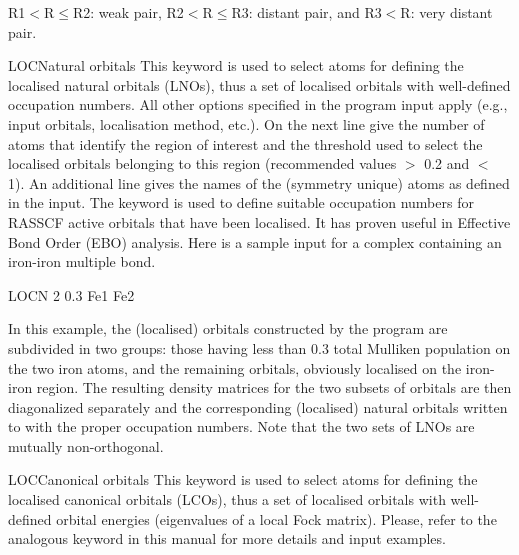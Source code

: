 \begin{keywordlist}
R1$<$R$\leq$R2: weak pair,
R2$<$R$\leq$R3: distant pair, and
R3$<$R: very distant pair.
\item[LOCNatural orbitals]
This keyword is used to select atoms for defining the localised natural
orbitals (LNOs), thus a set of localised orbitals with well-defined occupation numbers.
All other options specified in the  program input apply (e.g., input orbitals,
localisation method, etc.).
On the next line give the number of atoms that identify the region of interest
and the threshold used to select the localised orbitals belonging to this region
(recommended values $>$ 0.2 and $<$ 1).
An additional line gives the names of the (symmetry unique) atoms as defined in the  input.
The keyword  is used to define suitable occupation numbers for RASSCF active orbitals
that have been localised. It has proven useful in Effective Bond Order (EBO) analysis.
Here is a sample input for a complex containing an iron-iron multiple bond.
\begin{inputlisting}
 LOCN
 2  0.3
 Fe1  Fe2
\end{inputlisting}
In this example, the (localised) orbitals constructed by the  program
are subdivided in two groups: those having less than 0.3 total Mulliken population on
the two iron atoms, and the remaining orbitals, obviously localised on the iron-iron region. The resulting
density matrices for the two subsets of orbitals are then diagonalized separately
and the corresponding (localised) natural orbitals written to  with the proper occupation
numbers. Note that the two sets of LNOs are mutually non-orthogonal.
\item[LOCCanonical orbitals]
This keyword is used to select atoms for defining the localised canonical
orbitals (LCOs), thus a set of localised orbitals with well-defined orbital energies
(eigenvalues of a local Fock matrix).
Please, refer to the analogous keyword  in this manual for more details and input examples.
\end{keywordlist}



